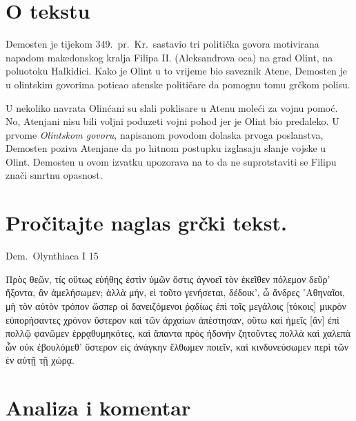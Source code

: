


\section*{O tekstu}

Demosten je tijekom 349.~pr.~Kr.\ sastavio tri politička govora motivirana napadom makedonskog kralja Filipa II. (Aleksandrova oca) na grad Olint, na poluotoku Halkidici. Kako je Olint u to vrijeme bio saveznik Atene, Demosten je u olintskim govorima poticao atenske političare da pomognu tomu grčkom polisu.

U nekoliko navrata Olinćani su slali poklisare u Atenu moleći za vojnu pomoć. No, Atenjani nisu bili voljni poduzeti vojni pohod jer je Olint bio predaleko. U prvome \textit{Olintskom govoru}, napisanom povodom dolaska prvoga poslanstva, Demosten poziva Atenjane da po hitnom postupku izglasaju slanje vojske u Olint. Demosten u ovom izvatku upozorava na to da ne suprotstaviti se Filipu znači smrtnu opasnost.


\section*{Pročitajte naglas grčki tekst.}

Dem.\ Olynthiaca I 15

\medskip

{\large
\begin{greek}
\noindent Πρὸς θεῶν, τίς οὕτως εὐήθης ἐστὶν ὑμῶν ὅστις ἀγνοεῖ τὸν ἐκεῖθεν πόλεμον δεῦρ'  ἥξοντα, ἂν ἀμελήσωμεν; ἀλλὰ μήν, εἰ τοῦτο γενήσεται, δέδοικ', ὦ ἄνδρες ᾿Αθηναῖοι, μὴ τὸν αὐτὸν τρόπον ὥσπερ οἱ δανειζόμενοι ῥᾳδίως ἐπὶ τοῖς μεγάλοις [τόκοις] μικρὸν εὐπορήσαντες χρόνον ὕστερον καὶ τῶν ἀρχαίων ἀπέστησαν, οὕτω καὶ ἡμεῖς [ἂν] ἐπὶ πολλῷ φανῶμεν ἐρρᾳθυμηκότες, καὶ ἅπαντα πρὸς ἡδονὴν ζητοῦντες πολλὰ καὶ χαλεπὰ ὧν οὐκ ἐβουλόμεθ' ὕστερον εἰς ἀνάγκην ἔλθωμεν ποιεῖν, καὶ κινδυνεύσωμεν περὶ τῶν ἐν αὐτῇ τῇ χώρᾳ.

\end{greek}
}

\section*{Analiza i komentar}

